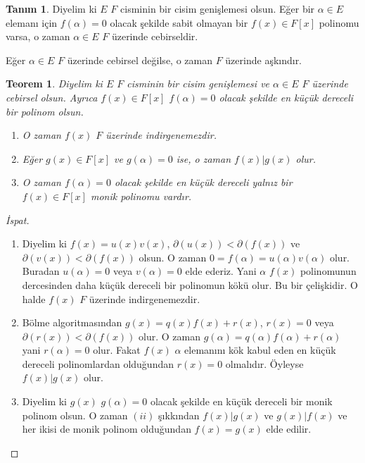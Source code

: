 \documentclass{article}
\newtheorem{thm}{Teorem}[section]
\theoremstyle{definition}
\newtheorem{defn}{Tanım}[section]
\theoremstyle{remark}
\begin{document}
		    \begin{defn}
		        Diyelim ki $E$ $F$ cisminin bir cisim genişlemesi olsun. Eğer bir $\alpha \in E$ elemanı için $f(\alpha) = 0$ olacak şekilde sabit olmayan bir $f(x) \in F[x]$ polinomu varsa, o zaman $\alpha \in E$ $F$ üzerinde cebirseldir.\par
		        Eğer $\alpha \in E$ $F$ üzerinde cebirsel değilse, o zaman $F$ üzerinde aşkındır.
            \end{defn}
            
            \begin{thm}
                Diyelim ki $E$ $F$ cisminin bir cisim genişlemesi ve  $\alpha \in E$ $F$ üzerinde cebirsel olsun. Ayrıca $f(x) \in F[x]$ $f(\alpha) = 0$ olacak şekilde en küçük dereceli bir polinom olsun.
                \begin{enumerate}
                \renewcommand{\labelenumi}{(\roman{enumi})}
                    \item O zaman $f(x)$ $F$ üzerinde indirgenemezdir.
                    \item Eğer $g(x) \in F[x]$ ve $g(\alpha) = 0$ ise, o zaman $f(x) | g(x)$ olur.
                    \item O zaman $f(\alpha) = 0$ olacak şekilde en küçük dereceli yalnız bir $f(x) \in F[x]$ monik polinomu vardır.
                \end{enumerate}
            \end{thm}
            
            \begin{proof}[İspat]
                \begin{enumerate}
                \renewcommand{\labelenumi}{(\roman{enumi})}
                    \item Diyelim ki $f(x) = u(x)v(x)$, $\partial(u(x)) < \partial(f(x))$ ve $\partial(v(x)) < \partial(f(x))$ olsun. O zaman $0 = f(\alpha) = u(\alpha)v(\alpha)$ olur. Buradan $u(\alpha) = 0$ veya $v(\alpha) = 0$ elde ederiz. Yani $\alpha$ $f(x)$ polinomunun dercesinden daha küçük dereceli bir polinomun kökü olur. Bu bir çelişkidir. O halde $f(x)$ $F$ üzerinde indirgenemezdir.
                    \item Bölme algoritmasından $g(x) = q(x)f(x) + r(x)$, $r(x) = 0$ veya $\partial(r(x)) < \partial(f(x))$ olur. O zaman $g(\alpha) = q(\alpha)f(\alpha) + r(\alpha)$ yani $r(\alpha) = 0$ olur. Fakat $f(x)$ $\alpha$ elemanını kök kabul eden en küçük dereceli polinomlardan olduğundan $r(x) = 0$ olmalıdır. Öyleyse $f(x) | g(x)$ olur.
                    \item Diyelim ki $g(x)$ $g(\alpha) = 0$ olacak şekilde en küçük dereceli bir monik polinom olsun. O zaman $(ii)$ şıkkından $f(x) | g(x)$ ve $g(x) | f(x)$ ve her ikisi de monik polinom olduğundan $f(x) = g(x)$ elde edilir.
                    \end{enumerate}
            \end{proof}
            
\end{document}
